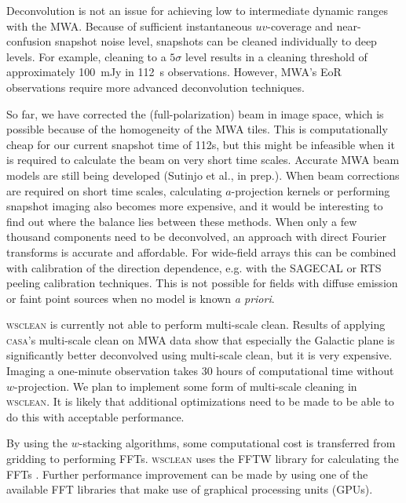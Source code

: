 \documentclass[useAMS,usenatbib]{mn2e}
\begin{document}
Deconvolution is not an issue for achieving low to intermediate dynamic ranges with the MWA. Because of sufficient instantaneous $uv$-coverage and near-confusion snapshot noise level, snapshots can be cleaned individually to deep levels. For example, cleaning to a $5\sigma$ level results in a cleaning threshold of approximately 100~mJy in 112~s observations. However, MWA's EoR observations \citep{bowman-science-with-the-mwa-2013} require more advanced deconvolution techniques.

So far, we have corrected the (full-polarization) beam in image space, which is possible because of the homogeneity of the MWA tiles. This is computationally cheap for our current snapshot time of 112s, but this might be infeasible when it is required to calculate the beam on very short time scales. Accurate MWA beam models are still being developed (Sutinjo et al., in prep.). When beam corrections are required on short time scales, calculating $a$-projection kernels or performing snapshot imaging also becomes more expensive, and it would be interesting to find out where the balance lies between these methods. When only a few thousand components need to be deconvolved, an approach with direct Fourier transforms is accurate and affordable. For wide-field arrays this can be combined with calibration of the direction dependence, e.g. with the SAGECAL \citep{sage-calibration-ii} or RTS peeling \citep{rts-mwa} calibration techniques. This is not possible for fields with diffuse emission or faint point sources when no model is known \textit{a priori}.

\textsc{wsclean} is currently not able to perform multi-scale clean. Results of applying \textsc{casa}'s multi-scale clean \citep{multiscale-clean-cornwell-2008} on MWA data show that especially the Galactic plane is significantly better deconvolved using multi-scale clean, but it is very expensive. Imaging a one-minute observation takes 30 hours of computational time without $w$-projection. We plan to implement some form of multi-scale cleaning in \textsc{wsclean}. It is likely that additional optimizations need to be made to be able to do this with acceptable performance.

By using the $w$-stacking algorithms, some computational cost is transferred from gridding to performing FFTs. \textsc{wsclean} uses the FFTW library for calculating the FFTs \citep{fftw-2005}. Further performance improvement can be made by using one of the available FFT libraries that make use of graphical processing units (GPUs).
\end{document}
